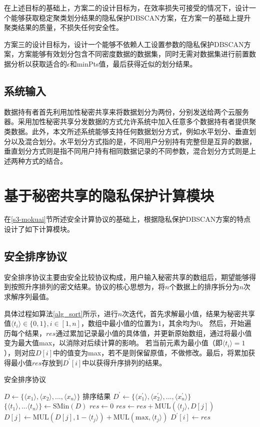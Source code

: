 在上述目标的基础上，方案二的设计目标为，在效率损失可接受的情况下，设计一个能够获取稳定聚类划分结果的隐私保护DBSCAN方案，在方案一的基础上提升聚类结果的质量，不损失任何安全性。

方案三的设计目标为，设计一个能够不依赖人工设置参数的隐私保护DBSCAN方案，方案能够有效划分包含不同密度数据的数据集，同时无需对数据集进行前置数据分析以获取适合的$\epsilon$和minPts值，最后获得近似的划分结果。

\subsection{系统输入}
数据持有者首先利用加性秘密共享来将数据划分为两份，分别发送给两个云服务器。采用加性秘密共享分发数据的方式允许系统中加入任意多个数据持有者提供聚类数据。此外，本文所述系统能够支持任何数据划分方式，例如水平划分、垂直划分以及混合划分。水平划分方式指的是，不同用户分别持有完整但是互异的数据\cite{gheid2016efficient}，垂直划分方式则是指不同用户持有相同数据记录的不同参数\cite{doganay2008distributed}，混合划分方式则是上述两种方式的结合\cite{yu2010multi}。
\section{基于秘密共享的隐私保护计算模块}
\label{s4-subpro}
在\ref{s3-mokuai}节所述安全计算协议的基础上，根据隐私保护DBSCAN方案的特点设计了如下计算模块。
\subsection{安全排序协议}
安全排序协议主要由安全比较协议构成，用户输入秘密共享的数组后，期望能够得到按照升序排列的密文结果。协议的核心思想为，将$ n $个数据上的排序拆分为$ n $次求解序列最值。

具体过程如算法\ref{alg_sort}所示，进行$ n $次迭代，首先求解最小值，结果为秘密共享值$ \langle t_i \rangle \in \{0,1\}, i\in[1,n] $，数组中最小值的位置为1，其余均为0。
然后，开始遍历每个结果，$ res $通过累加记录最小值的具体值，并更新原始数组，通过将最小值变为最大值max，以消除对后续计算的影响。
若当前元素为最小值（即$\langle t_i \rangle=1  $ ），则对应$ D[i] $中的值变为max，若不是则保留原值，不做修改。最后，将累加获得最小值$ res $存放到$ D^{\prime}[i] $中以获得升序排列的结果。

\begin{algorithm}[htbp]
	\renewcommand{\algorithmicrequire}{\textbf{输入:}}
	\renewcommand{\algorithmicensure}{\textbf{输出:}}
	\caption{安全排序协议}
	\label{alg_sort}
	\begin{algorithmic}[1]
		\REQUIRE $ D \leftarrow \{\langle  x_1 \rangle, \langle  x_2 \rangle,...,\langle  x_n \rangle\} $
		\ENSURE 排序结果 $ D^{\prime} \leftarrow \{\langle  x^{\prime}_1 \rangle, \langle  x^{\prime}_2 \rangle,...,\langle  x^{\prime}_n \rangle\} $
		\STATE $ \{\langle  t_1 \rangle,...\langle  t_n \rangle\} \leftarrow \text{SMin}(D)$
		\STATE $ res \leftarrow 0 $
		\STATE $ res \leftarrow res + \text{MUL}(\langle  t_j \rangle, D[j]) $
		\STATE $ D[j] \leftarrow \text{MUL}(D[j],1-\langle  t_j \rangle) + \text{MUL}(\text{max}, \langle  t_j \rangle)$
		\ENDFOR
		\STATE $ D^{\prime}[i] \leftarrow res $
		\ENDFOR
	\end{algorithmic}
\end{algorithm}
